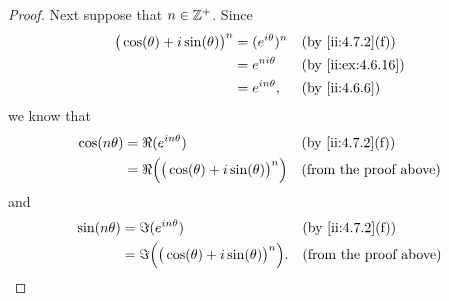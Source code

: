 \begin{proof}
  Next suppose that \(n \in \mathbb{Z}^+\).
  Since
  \begin{align*}
    \big(\cos(\theta) + i \sin(\theta)\big)^n & = (e^{i \theta})^n &  & \by{ii:4.7.2}[f]  \\
                                              & = e^{n i \theta}   &  & \by{ii:ex:4.6.16} \\
                                              & = e^{i n \theta},  &  & \by{ii:4.6.6}
  \end{align*}
  we know that
  \begin{align*}
    \cos(n \theta) & = \Re(e^{i n \theta})                                    &  & \by{ii:4.7.2}[f]              \\
                   & = \Re\Big(\big(\cos(\theta) + i \sin(\theta)\big)^n\Big) &  & \text{(from the proof above)}
  \end{align*}
  and
  \begin{align*}
    \sin(n \theta) & = \Im(e^{i n \theta})                                     &  & \by{ii:4.7.2}[f]              \\
                   & = \Im\Big(\big(\cos(\theta) + i \sin(\theta)\big)^n\Big). &  & \text{(from the proof above)}
  \end{align*}


\end{proof}
